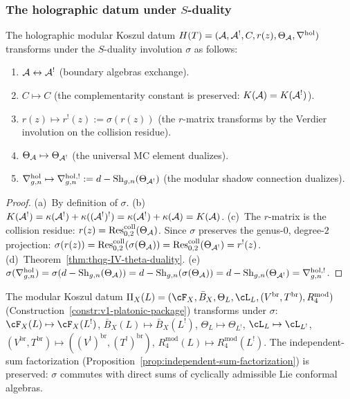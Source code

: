 \subsubsection{The holographic datum under $S$-duality}

\begin{proposition}
\label{prop:thqg-IV-holographic-datum}
The holographic modular Koszul datum
$H(T) = (\mathcal{A}, \mathcal{A}^!, C, r(z), \Theta_{\mathcal{A}}, \nabla^{\mathrm{hol}})$
transforms under the $S$-duality involution $\sigma$ as follows:
\begin{enumerate}[label=\textup{(\alph*)}]
\item $\mathcal{A} \leftrightarrow \mathcal{A}^!$ (boundary algebras exchange).
\item $C \mapsto C$ (the complementarity constant is preserved:
 $K(\mathcal{A}) = K(\mathcal{A}^!)$).
\item $r(z) \mapsto r^!(z) := \sigma(r(z))$ (the $r$-matrix
 transforms by the Verdier involution on the collision residue).
\item $\Theta_{\mathcal{A}} \mapsto \Theta_{\mathcal{A}^!}$ (the universal MC element
 dualizes).
\item $\nabla^{\mathrm{hol}}_{g,n} \mapsto \nabla^{\mathrm{hol},!}_{g,n}
 := d - \mathrm{Sh}_{g,n}(\Theta_{\mathcal{A}^!})$ (the modular shadow connection
 dualizes).
\end{enumerate}
\end{proposition}

\begin{proof}
(a)~By definition of $\sigma$.
(b)~$K(\mathcal{A}^!) = \kappa(\mathcal{A}^!) + \kappa((\mathcal{A}^!)^!) = \kappa(\mathcal{A}^!) + \kappa(\mathcal{A}) = K(\mathcal{A})$.
(c)~The $r$-matrix is the collision residue:
$r(z) = \operatorname{Res}^{\mathrm{coll}}_{0,2}(\Theta_{\mathcal{A}})$.
Since $\sigma$ preserves the genus-$0$, degree-$2$ projection:
$\sigma(r(z)) = \operatorname{Res}^{\mathrm{coll}}_{0,2}(\sigma(\Theta_{\mathcal{A}}))
= \operatorname{Res}^{\mathrm{coll}}_{0,2}(\Theta_{\mathcal{A}^!}) = r^!(z)$.
(d)~Theorem~\ref{thm:thqg-IV-theta-duality}.
(e)~$\sigma(\nabla^{\mathrm{hol}}_{g,n})
= \sigma(d - \mathrm{Sh}_{g,n}(\Theta_{\mathcal{A}}))
= d - \mathrm{Sh}_{g,n}(\sigma(\Theta_{\mathcal{A}}))
= d - \mathrm{Sh}_{g,n}(\Theta_{\mathcal{A}^!})
= \nabla^{\mathrm{hol},!}_{g,n}$.
\end{proof}

\begin{remark}
\label{rem:thqg-IV-six-fold-duality}
The modular Koszul datum $\Pi_X(L) = (\cF_X, \bar{B}_X, \Theta_L, \cL_L,
(V^{\mathrm{br}}, T^{\mathrm{br}}), R_4^{\mathrm{mod}})$
(Construction~\ref{constr:v1-platonic-package}) transforms under $\sigma$:
$\cF_X(L) \mapsto \cF_X(L^!)$,
$\bar{B}_X(L) \mapsto \bar{B}_X(L^!)$,
$\Theta_L \mapsto \Theta_{L^!}$,
$\cL_L \mapsto \cL_{L^!}$,
$(V^{\mathrm{br}}, T^{\mathrm{br}}) \mapsto ((V^!)^{\mathrm{br}}, (T^!)^{\mathrm{br}})$,
$R_4^{\mathrm{mod}}(L) \mapsto R_4^{\mathrm{mod}}(L^!)$.
The independent-sum factorization
(Proposition~\ref{prop:independent-sum-factorization}) is preserved:
$\sigma$ commutes with direct sums of cyclically admissible Lie
conformal algebras.
\end{remark}

